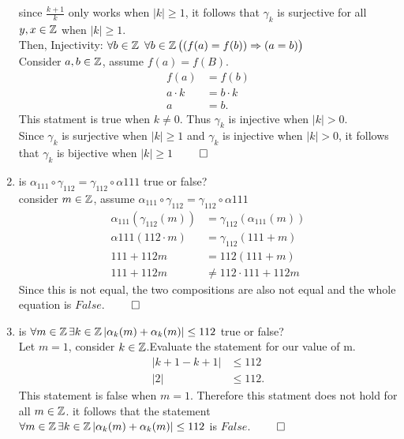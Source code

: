 \documentclass[11pt,twoside]{amsart}
\theoremstyle{definition}
\begin{document}
\begin{enumerate}[label= 1.\arabic*, itemsep=0.4cm]
          since $\frac{k+1}{k}$ only works when $|k| \geq 1$, it follows that $\gamma_k$ is surjective for all $y,x \in \operatorname*{\mathbb{Z}}$ when $|k| \geq 1$.\\
          Then, Injectivity: $\forall b \in \operatorname*{\mathbb{Z}} \ \forall b \in \operatorname*{\mathbb{Z}} \big( (f(a) = f(b)) \Rightarrow (a=b) \big)$\\
          Consider $a,b \in \operatorname*{\mathbb{Z}}$, assume $f(a)=f(B)$.
          \begin{align*}
            f(a) &= f(b) \\
            a \cdot k &= b \cdot k \\
            a &= b.
          \end{align*}
        This statment is true when $k \neq 0$. Thus $\gamma_k$ is injective when $|k| >0$. \\ 
      Since $\gamma_k$ is surjective when $|k| \geq 1$ and $\gamma_k$ is injective when $|k| > 0$, it follows that $\gamma_k$ is bijective when $|k| \geq 1$ $\qed$


        \item %
          is $\alpha_{111} \circ \gamma_{112} = \gamma_{112} \circ \alpha{111}$ true or false? \\
           consider $m \in \operatorname*{\mathbb{Z}}$, assume $\alpha_{111} \circ \gamma_{112} = \gamma_{112} \circ \alpha{111}$
          \begin{align*}
            \alpha_{111}(\gamma_{112}(m)) &= \gamma_{112}(\alpha_{111} (m))\\
            \alpha{111}(112\cdot m) &= \gamma_{112}(111+m)\\
            111+112m &= 112(111+m)\\
            111+112m &\neq 112\cdot 111 +112m
          \end{align*}
          Since this is not equal, the two compositions are also not equal and the whole equation is $False$. $\qed$

        \item %
          is $\forall m \in \operatorname*{\mathbb{Z}} \exists k \in \operatorname*{\mathbb{Z}} | \alpha_k(m) + \alpha_k(m)| \leq 112$ true or false?\\
         Let $m = 1$, consider $k \in \operatorname*{\mathbb{Z}}$.Evaluate the statement for our value of m.
        \begin{align*}
          |k+1-k+1| &\leq 112 \\
          |2| &\leq 112.
        \end{align*}
       This statement is false when $m=1$. Therefore this statment does not hold for all $m \in \operatorname*{\mathbb{Z}}$. it follows that the statement $\forall m \in \operatorname*{\mathbb{Z}} \exists k \in \operatorname*{\mathbb{Z}} | \alpha_k(m) + \alpha_k(m)| \leq 112$ is $False$. $\qed$


\end{enumerate}
\end{document}
